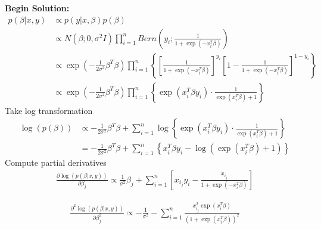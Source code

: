 \documentclass[twoside]{article}
\begin{document}
\textbf{Begin Solution:}
\begin{equation*}
\begin{split}
p(\beta|x,y) &\propto p(y|x,\beta)p(\beta)\\
&\propto N(\beta;0,\sigma^2 I) \prod_{i = 1}^n Bern(y_i;\frac{1}{1+\exp(-x_i^T\beta)})\\
&\propto \exp\left(-\frac{1}{2\sigma^2}\beta^T\beta \right)\prod_{i = 1}^n \left\{ \left[ \frac{1}{1+\exp\left(-x_i^T\beta\right)}\right]^{y_i} \left[1 - \frac{1}{1+\exp \left(-x_i^T\beta \right)} \right]^{1-y_i}\right\}\\
&\propto \exp\left(-\frac{1}{2\sigma^2}\beta^T\beta \right)\prod_{i = 1}^n \left\{\exp\left(x_i^T\beta y_i\right)\cdot \frac{1}{\exp \left(x_i^T \beta\right) + 1} \right\}
\end{split}
\end{equation*}
Take log transformation
\begin{equation*}
\begin{split}
\log\left(p\left(\beta\right) \right) &\propto -\frac{1}{2\sigma^2}\beta^T\beta+\sum_{i = 1}^n\log\left\{\exp\left(x_i^T\beta y_i \right)\cdot \frac{1}{\exp\left(x_i^T\beta \right) + 1} \right\}\\
&= -\frac{1}{2\sigma^2}\beta^T\beta+\sum_{i = 1}^n\left\{x_i^T\beta y_i - \log\left( \exp\left( x_i^T\beta\right) + 1\right) \right\}
\end{split}
\end{equation*}
Compute partial derivatives
\begin{equation*}
\begin{split}
\frac{\partial \log \left(p(\beta|x,y) \right)}{\partial \beta_j} \propto \frac{1}{\sigma^2}\beta_j + \sum_{i = 1}^n \left[x_{i_j}y_i - \frac{x_{i_j}}{1 + \exp\left(-x_i^T\beta \right)} \right]
\end{split}
\end{equation*}

\begin{equation*}
\begin{split}
\frac{\partial^2 \log \left(p(\beta|x,y) \right)}{\partial \beta_j^2} \propto -\frac{1}{\sigma^2} - \sum_{i = 1}^n \frac{x_{i_j}^2 \exp\left(x_i^T\beta\right)}{\left(1+\exp\left(x_i^T\beta\right)\right)^2}
\end{split}
\end{equation*}
\end{document}
